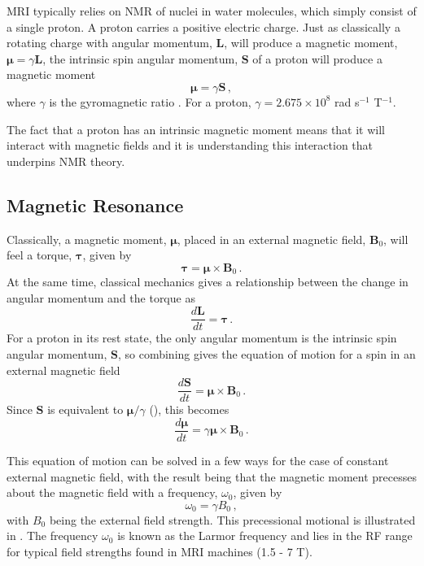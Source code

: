 \ac{MRI} typically relies on \ac{NMR} of  nuclei in water molecules, which simply consist of a single proton.
A proton carries a positive electric charge.
Just as classically a rotating charge with angular momentum, $\mathbf{L}$, will produce a magnetic moment, $
\boldsymbol{\mu} = \gamma \mathbf{L}$, the intrinsic spin angular momentum, $\mathbf{S}$ of a proton will produce a magnetic moment 
\begin{equation}
\label{eq:magnmom}
\boldsymbol{\mu} = \gamma \mathbf{S} \,,
\end{equation}
where $\gamma$ is the gyromagnetic ratio \cite{Levitt2008}.
For a proton, $\gamma = 2.675 \times 10^8$ rad s$^{-1}$ T$^{-1}$.

The fact that a proton has an intrinsic magnetic moment means that it will interact with magnetic fields and it is understanding this interaction that underpins \ac{NMR} theory.


\subsection{Magnetic Resonance}
\label{sec:bg_resonance}
Classically, a magnetic moment, $\boldsymbol{\mu}$, placed in an external magnetic field, $\mathbf{B}_0$, will feel a torque, $\boldsymbol{\tau}$, given by \cite{Haacke1999} 
\begin{equation}
\label{eq:torque}
\boldsymbol{\tau} = \boldsymbol{\mu} \times \mathbf{B}_0 \,.
\end{equation}
At the same time, classical mechanics gives a relationship between the change in angular momentum and the torque as \cite{Haacke1999} 
\begin{equation}
\label{eq:dLdt}
\frac{d\mathbf{L}}{dt} = \boldsymbol{\tau}\,. 
\end{equation}
For a proton in its rest state, the only angular momentum is the intrinsic spin angular momentum, $\mathbf{S}$, so combining  gives the equation of motion for a spin in an external magnetic field
\begin{equation}
\frac{d\mathbf{S}}{dt} = \boldsymbol{\mu} \times \mathbf{B}_0 \,.
\end{equation}
Since $\mathbf{S}$ is equivalent to $\boldsymbol{\mu}/\gamma$ (), this becomes
\begin{equation}
\frac{d\boldsymbol{\mu}}{dt} = \gamma\boldsymbol{\mu} \times \mathbf{B}_0\,.
\label{eq:dmudt}
\end{equation}

This equation of motion can be solved in a few ways for the case of constant external magnetic field, with the result being that the magnetic moment precesses about the magnetic field with a frequency, $\omega_0$, given by\cite{Levitt2008}
\begin{equation}
\label{eq:LarmorFreq}
\omega_0 = \gamma B_0\,,
\end{equation}
with $B_0$ being the external field strength. 
This precessional motional is illustrated in .
The frequency $\omega_0$ is known as the Larmor frequency and lies in the \ac{RF} range for typical field strengths found in MRI machines (1.5 - 7 T).

